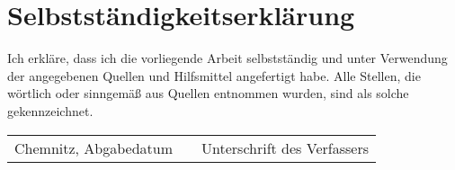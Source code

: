 \section*{Selbstständigkeitserklärung}


Ich erkläre, dass ich die vorliegende Arbeit selbstständig und unter Verwendung der angegebenen
Quellen und Hilfsmittel angefertigt habe. Alle Stellen, die wörtlich oder sinngemäß aus Quellen
entnommen wurden, sind als solche gekennzeichnet.

\vspace{2cm}

\begin{tabularx}{\columnwidth}{lXr}
  \hline 
  Chemnitz, Abgabedatum &  &Unterschrift des Verfassers
\end{tabularx}
